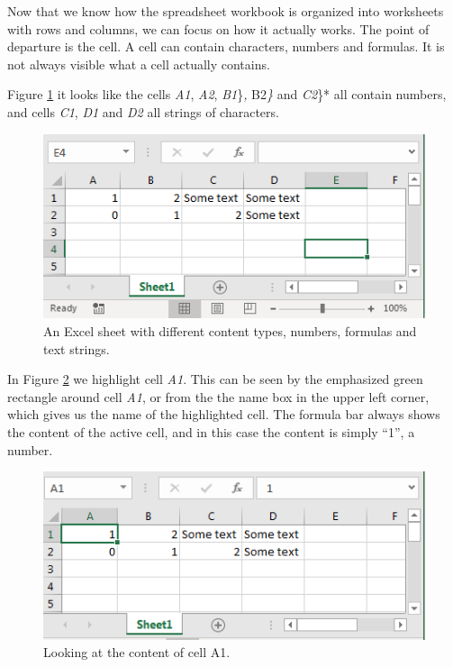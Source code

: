 \documentclass[]{book}
\begin{document}
Now that we know how the spreadsheet workbook is organized into worksheets with rows and columns, we can focus on how it actually works. The point of departure is the cell. A cell can contain characters, numbers and formulas. It is not always visible what a cell actually contains.

Figure \ref{fig:ex3} it looks like the cells \emph{A1}, \emph{A2}, \emph{B1}\}\emph{, }B2\emph{\}} and \emph{C2}\}* all contain numbers, and cells \emph{C1}, \emph{D1} and \emph{D2} all strings of characters.

\begin{figure}

{\centering \includegraphics[width=0.75\linewidth]{_resources/chapter_excelbasic/ex1} 

}

\caption{An Excel sheet with different content types, numbers, formulas and text strings.}\label{fig:ex3}
\end{figure}

In Figure \ref{fig:ex4} we highlight cell \emph{A1}. This can be seen by the emphasized green rectangle around cell \emph{A1}, or from the the name box in the upper left corner, which gives us the name of the highlighted cell. The formula bar always shows the content of the active cell, and in this case the content is simply ``1'', a number.

\begin{figure}

{\centering \includegraphics[width=0.75\linewidth]{_resources/chapter_excelbasic/ex2} 

}

\caption{Looking at the content of cell A1.}\label{fig:ex4}
\end{figure}
\end{document}
